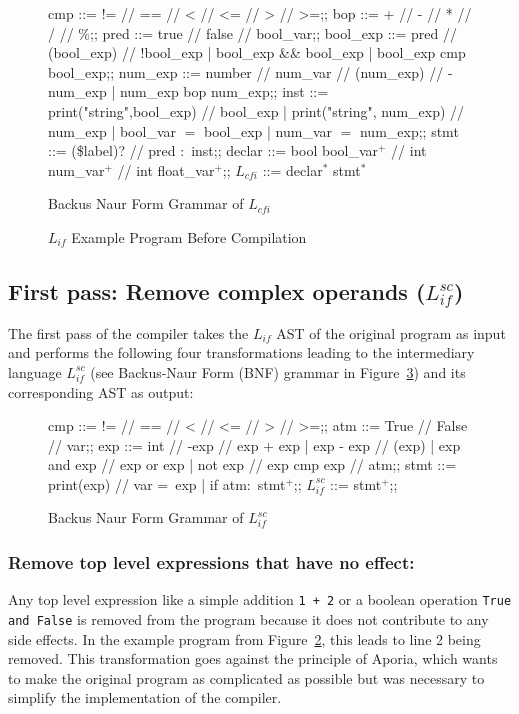 \begin{figure}[h!]
	\centering
	\begin{bnf}[row{-} = {bg = gray9}]
		cmp ::= != // == // < // <= // > // >=;;
		bop ::= + // - // * // / // \%;;
		pred ::= true // false // bool\_var;;
		bool\_exp ::= pred // (bool\_exp) // !bool\_exp
		| bool\_exp \&\& bool\_exp
		| bool\_exp cmp bool\_exp;;
		num\_exp ::= number // num\_var // (num\_exp) // -num\_exp
		| num\_exp bop num\_exp;;
		inst ::= print("string",bool\_exp) // bool\_exp
		| print("string", num\_exp) // num\_exp
		| bool\_var $=$ bool\_exp
		| num\_var $=$ num\_exp;;
		stmt ::= (\$label)? // pred $\colon$ inst;;
		declar ::= bool bool\_var$^+$ // int num\_var$^+$ // int float\_var$^+$;;
		$L_{cfi}$ ::= declar$^*$ stmt$^*$
	\end{bnf}
	\caption{Backus Naur Form Grammar of $L_{cfi}$}
	\label{bnf:lcfi}
\end{figure}

\begin{figure}[h!]
	\centering
	
	\caption{$L_{if}$ Example Program Before Compilation}
	\label{code:lif}
\end{figure}

\subsection{First pass: Remove complex operands ($L_{if}^{sc}$)}


The first pass of the compiler takes the $L_{if}$ AST of the original program as input and performs the following four transformations leading to the intermediary language $L_{if}^{sc}$ (see Backus-Naur Form (BNF) grammar in Figure~\ref{bnf:sc}) and its corresponding AST as output:

\begin{figure}[h!]
	\centering
	\begin{bnf}[row{-} = {bg = gray9}]
		cmp ::= != // == // < // <= // > // >=;;
		atm ::= True // False // var;;
		exp ::= int  // -exp // exp + exp 
		| exp - exp // (exp)
		| exp and exp // exp or exp 
		| not exp // exp cmp exp // atm;;
		stmt ::= print(exp) // var = exp
		| if atm$\colon$ stmt$^+$;;
		$L_{if}^{sc}$ ::= stmt$^+$;;
	\end{bnf}
	\caption{Backus Naur Form Grammar of $L_{if}^{sc}$}
	\label{bnf:sc}
\end{figure}

\subsubsection{Remove top level expressions that have no effect:}
Any top level expression like a simple addition \texttt{1 + 2} or a boolean operation \texttt{True and False} is removed from the program because it does not contribute to any side effects. In the example program from Figure~\ref{code:lif}, this leads to line 2 being removed.
This transformation goes against the principle of Aporia, which wants to make the original program as complicated as possible but was necessary to simplify the implementation of the compiler.

